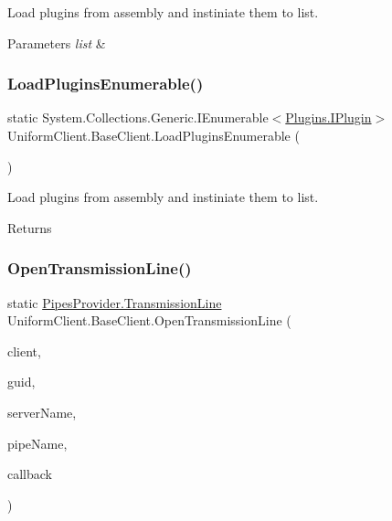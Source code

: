 Load plugins from assembly and instiniate them to list. 


\begin{DoxyParams}{Parameters}
{\em list} & \\
\hline
\end{DoxyParams}
\mbox{\label{class_uniform_client_1_1_base_client_aa60dbfa5bd8c46659aec7738193315f1}} 
\subsubsection{\texorpdfstring{Load\+Plugins\+Enumerable()}{LoadPluginsEnumerable()}}
{\footnotesize\ttfamily static System.\+Collections.\+Generic.\+I\+Enumerable$<$\mbox{\hyperlink{interface_uniform_client_1_1_plugins_1_1_i_plugin}{Plugins.\+I\+Plugin}}$>$ Uniform\+Client.\+Base\+Client.\+Load\+Plugins\+Enumerable (\begin{DoxyParamCaption}{ }\end{DoxyParamCaption})\hspace{0.3cm}{\ttfamily [static]}}



Load plugins from assembly and instiniate them to list. 

\begin{DoxyReturn}{Returns}

\end{DoxyReturn}
\mbox{\label{class_uniform_client_1_1_base_client_a3b09387a94e46bf9365ee603202ba488}} 
\subsubsection{\texorpdfstring{Open\+Transmission\+Line()}{OpenTransmissionLine()}}
{\footnotesize\ttfamily static \mbox{\hyperlink{class_pipes_provider_1_1_transmission_line}{Pipes\+Provider.\+Transmission\+Line}} Uniform\+Client.\+Base\+Client.\+Open\+Transmission\+Line (\begin{DoxyParamCaption}\item[{\mbox{\hyperlink{class_uniform_client_1_1_base_client}{Base\+Client}}}]{client,  }\item[{string}]{guid,  }\item[{string}]{server\+Name,  }\item[{string}]{pipe\+Name,  }\item[{System.\+Action$<$ object $>$}]{callback }\end{DoxyParamCaption})\hspace{0.3cm}{\ttfamily [static]}}



